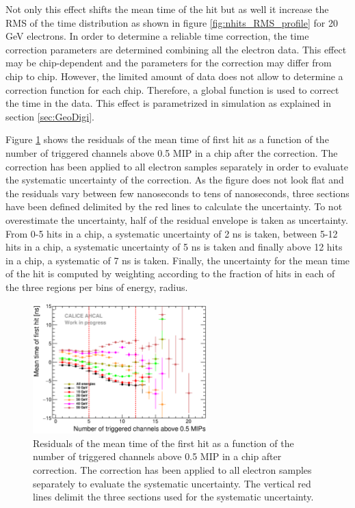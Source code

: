 \documentclass{JINST}
\begin{document}
Not only this effect shifts the mean time of the hit but as well it increase the RMS of the time distribution as shown in figure \ref{fig:nhits_RMS_profile} for 20 GeV electrons. In order to determine a reliable time correction, the time correction parameters are determined combining all the electron data. This effect may be chip-dependent and the parameters for the correction may differ from chip to chip. However, the limited amount of data does not allow to determine a correction function for each chip. Therefore, a global function is used to correct the time in the data. This effect is parametrized in simulation as explained in section \ref{sec:GeoDigi}.

Figure \ref{fig:Nhit_residuals} shows the residuals of the mean time of first hit as a function of the number of triggered channels above 0.5 MIP in a chip after the correction. The correction has been applied to all electron samples separately in order to evaluate the systematic uncertainty of the correction. As the figure does not look flat and the residuals vary between few nanoseconds to tens of nanoseconds, three sections have been defined delimited by the red lines to calculate the uncertainty. To not overestimate the uncertainty, half of the residual envelope is taken as uncertainty. From 0-5 hits in a chip, a systematic uncertainty of 2 ns is taken, between 5-12 hits in a chip, a systematic uncertainty of 5 ns is taken and finally above 12 hits in a chip, a systematic of 7 ns is taken. Finally, the uncertainty for the mean time of the hit is computed by weighting according to the fraction of hits in each of the three regions per bins of energy, radius.

\begin{figure}[htbp!]
  \centering
  \includegraphics[width=0.6\textwidth]{fig/CheckCorrection.eps}
  \caption{Residuals of the mean time of the first hit as a function of the number of triggered channels above 0.5 MIP in a chip after correction. The correction has been applied to all electron samples separately to evaluate the systematic uncertainty. The vertical red lines delimit the three sections used for the systematic uncertainty.}
  \label{fig:Nhit_residuals}
\end{figure}
\end{document}
